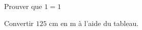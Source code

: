 \begin{exercice*}
    \partie
    Prouver que $1=1$

    \partie
    Convertir $125$ cm en m à l'aide du tableau.

\end{exercice*}
